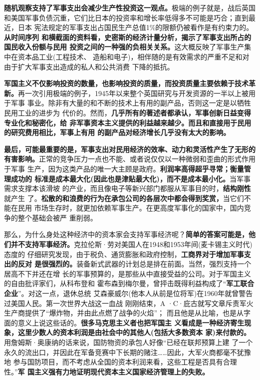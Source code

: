 \textbf{随机观察支持了军事支出会减少生产性投资这一观点。}极端的例子就是，战后英国
和美国军事负债沉重，它们比日本的投资率和增长率低得多不可能是巧合；直到最近，日本
宪法规定的军事支出占国民生产总值1\%的限额仍被看作是有约束力的。\textbf{从时间序列
  和横截面的资料看，史密斯的经济计量分析，揭示了军事支出所占的国民收入份额与民用
  投资之间的一种强的负相关关系。}这大概反映了军事生产集中在资本品工业(工程技术、
造船和电子)，相伴随的是有效需求的严重不足和对由于扩大军事支出造成的私人和公共消费
下降的抵抗。

\textbf{军国主义不仅影响投资的数量，也影响投资的质量，而投资质量主要依赖于技术革
  新。}再一次引用极端的例子，1945年以来整个英国研究与开发资源的一半以上被用于军事
事业。除非有大量的和不断的技术上有用的副产品，否则这一定是以牺牲民用工业的进步为
代价的。然而，\textbf{几乎所有的著述者都承认，军事创新日益变得专业化和秘密化，给
  非军事资本主义提供的利益越来越少。而且和直接用于民用的研究费用相比，军事上有用
的副产品对经济增长几乎没有太大的影响。}

\textbf{最后，可能最重要的是，军事支出对民用经济的效率、动力和灵活性产生了无形的
  有害影响。}正常的竞争压力一点也不能、或者说仅仅以一种微弱和歪曲的形式作用于军事
生产，因为这类产品的唯一大主顾是政府。\textbf{利润率高得超乎寻常；衡量管理成功的
  标准是成本最大化(因此也是津贴最大化)，而不是成本最小化。}当军事需求支撑本该滑坡
的产业，而且像电子等新兴部门都服从军事目的时，\textbf{结构刚性}就产生
了。\textbf{松散的和浪费的行为在承包公司的各层次中都会得到奖赏，}当它们不能在民用
市场生存时，就更加依赖军事生产。在更高度军事化的国家中，国内竞争的整个基础会被严
重削弱。

那么，为什么身处这种经济中的资本家会支持军事经济呢？\textbf{简单的答案可能是，他
  们并不支持军事经济。}克拉伦斯·劳对美国人在1948和1953年间(麦卡锡主义时代)态度的
仔细研究发现，由于税负、通货膨胀和政府控制，\textbf{工商界对于增加军事支出的反对
  是很强烈的。}装备新式武器的计划总是排在前面。当然，强烈支持一个居高不下并还在增
长的军事预算的，是那些从中直接受益的公司。对于军国主义的自由批评家们，从科布登和
霍布森到梅尔曼，曾抨击既得利益构成了“\textbf{军工联合企业}”。对这一点，退休总统
艾森豪威尔(他本人从前是位将军)在1960年就曾警告过美国人民。第一次世界大战这一血战
刚刚结束，A ·C·庇古就写文章斥责军火生产商提供了“爆炸物，并由此点燃了战争的火焰”；
而且他是从比喻，也是从字面的意义上说这些话的。\textbf{很多马克思主义者也把军国主
  义看成是一种经济寄生现象，这里少数人的资本利润是由社会中的其他人(包括大多数资本
  家)来付款的。}用詹姆斯·奥康纳的话来说，国防物资的承包人好像“已经在联邦预算上建
了一个永久的流出口，并因此在军备竞赛中下长期的赌注……因此，大军火商都毫不犹豫地
参与国防项目，而不考虑从全国的资本利润来看，这些工程是否具有合理性。”\textbf{军
  国主义强有力地证明现代资本主义国家经济管理上的失败。}

